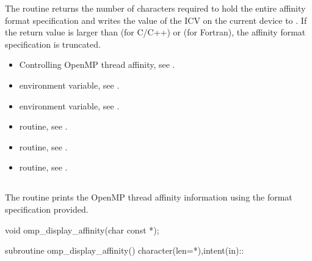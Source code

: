 \effect
The  routine returns the number of characters required
to hold the entire affinity format specification and writes the value of the
 ICV on the current device to .
If the return value is larger than  (for C/C++) or 
(for Fortran), the affinity format specification is truncated.

\crossreferences
\begin{itemize}
\item Controlling OpenMP thread affinity, see 
. 
\item {} environment variable, see 
.
\item {} environment variable, see 
.
\item {} routine, see .
\item {} routine, see .
\item {} routine, see .
\end{itemize}


\subsection{}
\label{subsec:omp_display_affinity}

\summary
The  routine prints the OpenMP thread affinity information using the format specification provided.

\format
\begin{ccppspecific}
\begin{boxedcode}
void omp\_display\_affinity(char const *);
\end{boxedcode}
\end{ccppspecific}

\begin{fortranspecific}
\begin{boxedcode}
subroutine omp\_display\_affinity()
character(len=*),intent(in)::
\end{boxedcode}
\end{fortranspecific}

